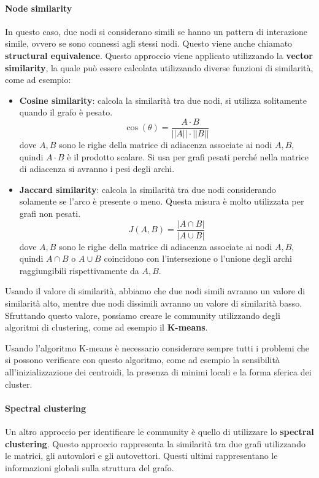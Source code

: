 \paragraph{Node similarity}
In questo caso, due nodi si considerano simili se hanno un pattern di interazione
simile, ovvero se sono connessi agli stessi nodi. Questo viene anche chiamato
\textbf{structural equivalence}. Questo approccio viene applicato utilizzando la
\textbf{vector similarity}, la quale può essere calcolata utilizzando diverse
funzioni di similarità, come ad esempio:
\begin{itemize}
    \item \textbf{Cosine similarity}: calcola la similarità tra due nodi, si
          utilizza solitamente quando il grafo è pesato.
          \begin{equation*}
              \cos(\theta) = \frac{A \cdot B}{||A|| \cdot ||B||}
          \end{equation*}
          dove $A,B$ sono le righe della matrice di adiacenza associate ai nodi $A,B$,
          quindi $A\cdot B$ è il prodotto scalare. Si usa per grafi pesati perché
          nella matrice di adiacenza si avranno i pesi degli archi.
    \item \textbf{Jaccard similarity}: calcola la similarità tra due nodi
          considerando solamente se l'arco è presente o meno. Questa misura
          è molto utilizzata per grafi non pesati.
          \begin{equation*}
              J(A, B) = \frac{|A \cap B|}{|A \cup B|}
          \end{equation*}
          dove $A,B$ sono le righe della matrice di adiacenza associate ai nodi $A,B$,
          quindi $A\cap B$ o $A\cup B$ coincidono con l'intersezione o l'unione degli
          archi raggiungibili rispettivamente da $A,B$.
\end{itemize}
Usando il valore di similarità, abbiamo che due nodi simili avranno un valore
di similarità alto, mentre due nodi dissimili avranno un valore di similarità
basso. Sfruttando questo valore, possiamo creare le community utilizzando
degli algoritmi di clustering, come ad esempio il \textbf{K-means}.
\begin{nota}
    Usando l'algoritmo K-means è necessario considerare sempre tutti i problemi
    che si possono verificare con questo algoritmo, come ad esempio la sensibilità
    all'inizializzazione dei centroidi, la presenza di minimi locali e la forma
    sferica dei cluster.
\end{nota}
\paragraph{Spectral clustering}
Un altro approccio per identificare le community è quello di utilizzare lo
\textbf{spectral clustering}. Questo approccio rappresenta la similarità tra due
grafi utilizzando le matrici, gli autovalori e gli autovettori. Questi ultimi
rappresentano le informazioni globali sulla struttura del grafo.

